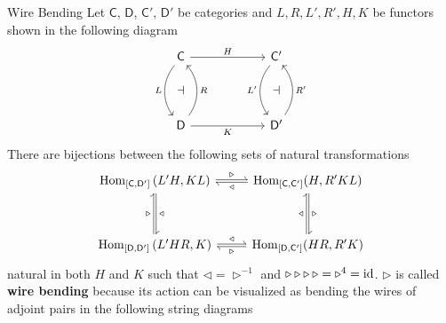 \begin{definition}{Wire Bending}{}
Let $\mathsf{C}$, $\mathsf{D}$, $\mathsf{C'}$, $\mathsf{D'}$ be categories and $L,R,L',R',H,K$ be functors shown in the following diagram
\[
    \begin{tikzcd}[ampersand replacement=\&]
        \mathsf{C} \arrow[dd, "L"', bend right=38] \arrow[r, "H"]  \&[+36pt] \mathsf{C'} \arrow[dd, "L'"', bend right=38] \\[-5pt]
        \dashv                                                  \& \dashv                                    \\[-5pt]
        \mathsf{D} \arrow[uu, "R"', bend right=38] \arrow[r, "K"'] \& \mathsf{D'} \arrow[uu, "R'"', bend right=38]
        \end{tikzcd}    
\]
There are bijections between the following sets of natural transformations
\[
    \begin{tikzcd}[ampersand replacement=\&]
        {\mathrm{Hom}_{[\mathsf{C}, \mathsf{D'}]}\left(L'H, KL\right) } \arrow[r, shift left=1pt, rightharpoonup, "\triangleright"]\arrow[r, shift right=1pt,leftharpoondown, "\triangleleft"']  \& {\mathrm{Hom}_{[\mathsf{C}, \mathsf{C'}]}(H, R'KL) } \arrow[d, shift left=1pt, rightharpoonup, "\triangleright"]\arrow[d, shift right=1pt,leftharpoondown, "\triangleleft"']   \\[+15pt]
        { \mathrm{Hom}_{[\mathsf{D}, \mathsf{D'}]}\left(L'HR, K\right)} \arrow[u, shift left=1pt, rightharpoonup, "\triangleright"]\arrow[u, shift right=1pt,leftharpoondown, "\triangleleft"'] \& {\mathrm{Hom}_{[\mathsf{D}, \mathsf{C'}]}(HR, R'K) } \arrow[l, shift left=1pt, rightharpoonup, "\triangleright"]\arrow[l, shift right=1pt,leftharpoondown, "\triangleleft"'] 
        \end{tikzcd}    
\]
natural in both $H$ and $K$ such that $\triangleleft=\triangleright^{-1}$ and $\triangleright\triangleright\triangleright\hspace{2.15pt}\triangleright=\triangleright^4=\mathrm{id}$. $\triangleright$ is called \textbf{wire bending} because its action can be visualized as bending the wires of adjoint pairs in the following string diagrams

\begin{center}
\end{center}
\end{definition}
